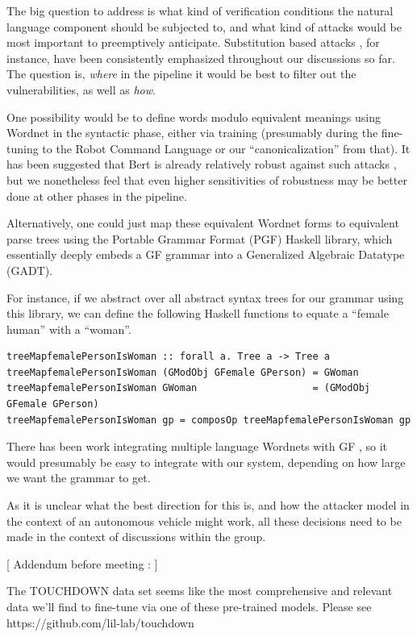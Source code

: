 \documentclass{article}
\begin{document}
The big question to address is what kind of verification conditions the natural
language component should be subjected to, and what kind of attacks would be
most important to preemptively anticipate. Substitution based attacks
\cite{substAttacks}, for instance, have been consistently emphasized throughout
our discussions so far. The question is, \emph{where} in the pipeline it would
be best to filter out the vulnerabilities, as well as \emph{how}.

One possibility would be to define words modulo equivalent meanings using
Wordnet \cite{wordnet} in the syntactic phase, either via training
\cite{ren-etal-2019-generating} (presumably during the fine-tuning to the Robot
Command Language or our ``canonicalization'' from that). It has been suggested
that Bert is already relatively robust against such attacks
\cite{hauser2021bert}, but we nonetheless feel that even higher sensitivities of
robustness may be better done at other phases in the pipeline.

Alternatively, one could just map these equivalent Wordnet forms to equivalent
parse trees using the Portable Grammar Format (PGF) Haskell library, which
essentially deeply embeds a GF grammar into a Generalized Algebraic Datatype
(GADT).

For instance, if we abstract over all abstract syntax trees for our grammar
using this library, we can define the following Haskell functions to equate a
``female human'' with a ``woman''.

\begin{verbatim}
treeMapfemalePersonIsWoman :: forall a. Tree a -> Tree a
treeMapfemalePersonIsWoman (GModObj GFemale GPerson) = GWoman
treeMapfemalePersonIsWoman GWoman                    = (GModObj GFemale GPerson)
treeMapfemalePersonIsWoman gp = composOp treeMapfemalePersonIsWoman gp
\end{verbatim}

There has been work integrating multiple language Wordnets with GF
\cite{virk2014developing}, so it would presumably be easy to integrate with our
system, depending on how large we want the grammar to get.


As it is unclear what the best direction for this is, and how the attacker model
in the context of an autonomous vehicle might work, all these decisions need to
be made in the context of discussions within the group.

[ Addendum before meeting : ]

The TOUCHDOWN data set \cite{chen2019touchdown} seems like the most
comprehensive and relevant data we'll find to fine-tune via one of these
pre-trained models. Please see https://github.com/lil-lab/touchdown
\end{document}
